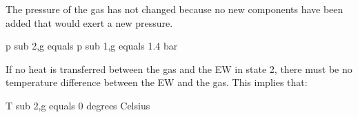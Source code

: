 The pressure of the gas has not changed because no new components have been added that would exert a new pressure.  

p sub 2,g equals p sub 1,g equals 1.4 bar  

If no heat is transferred between the gas and the EW in state 2, there must be no temperature difference between the EW and the gas. This implies that:  

T sub 2,g equals 0 degrees Celsius